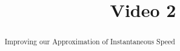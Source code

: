 \documentclass[handout]{ximera}
\title{Video 2}
\begin{document}
\begin{abstract}
Improving our Approximation of Instantaneous Speed
\end{abstract}

\maketitle

\end{document}
